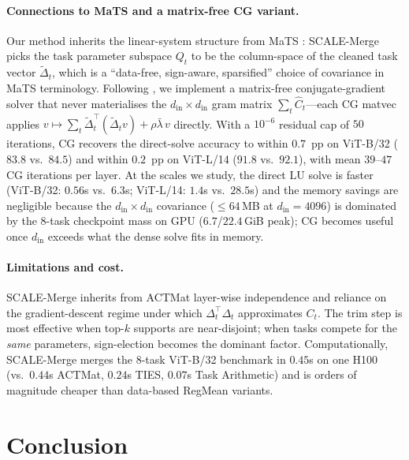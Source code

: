 \documentclass{article} %
\begin{document}
\paragraph{Connections to MaTS and a matrix-free CG variant.} Our method inherits the linear-system structure from MaTS \citep{tam2024mats}: SCALE-Merge picks the task parameter subspace $Q_t$ to be the column-space of the cleaned task vector $\tilde\Delta_t$, which is a ``data-free, sign-aware, sparsified'' choice of covariance in MaTS terminology. Following \citet{tam2024mats}, we implement a matrix-free conjugate-gradient solver that never materialises the $d_\text{in}{\times}d_\text{in}$ gram matrix $\sum_t \hat C_t$---each CG matvec applies $v\mapsto \sum_t\tilde\Delta_t^\top(\tilde\Delta_t v)+\rho\bar\lambda\,v$ directly. With a $10^{-6}$ residual cap of $50$ iterations, CG recovers the direct-solve accuracy to within $0.7$~pp on ViT-B/32 ($83.8$ vs.\ $84.5$) and within $0.2$~pp on ViT-L/14 ($91.8$ vs.\ $92.1$), with mean $39$--$47$ CG iterations per layer. At the scales we study, the direct $\mathrm{LU}$ solve is faster (ViT-B/32: $0.56$s vs.\ $6.3$s; ViT-L/14: $1.4$s vs.\ $28.5$s) and the memory savings are negligible because the $d_\text{in}{\times}d_\text{in}$ covariance ($\leq 64$\,MB at $d_\text{in}{=}4096$) is dominated by the $8$-task checkpoint mass on GPU ($6.7$/$22.4$\,GiB peak); CG becomes useful once $d_\text{in}$ exceeds what the dense solve fits in memory.

\paragraph{Limitations and cost.} SCALE-Merge inherits from ACTMat layer-wise independence and reliance on the gradient-descent regime under which $\Delta_t^\top\Delta_t$ approximates $C_t$. The trim step is most effective when top-$k$ supports are near-disjoint; when tasks compete for the \emph{same} parameters, sign-election becomes the dominant factor. Computationally, SCALE-Merge merges the 8-task ViT-B/32 benchmark in $0.45$s on one H100 (vs.\ $0.44$s ACTMat, $0.24$s TIES, $0.07$s Task Arithmetic) and is orders of magnitude cheaper than data-based RegMean variants.

\section{Conclusion}
\end{document}
